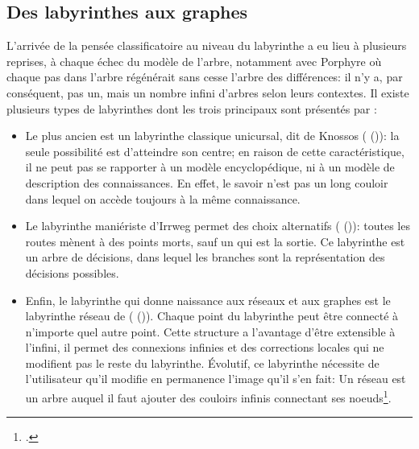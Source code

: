 \subsection{\label{III-A-1-b}Des labyrinthes aux graphes}

L'arrivée de la pensée classificatoire au niveau du labyrinthe a eu lieu à plusieurs reprises, à chaque échec du modèle de l'arbre, notamment avec Porphyre où chaque pas dans l'arbre régénérait sans cesse l'arbre des différences: il n'y a, par conséquent, pas un, mais un nombre infini d'arbres selon leurs contextes. Il existe plusieurs types de labyrinthes dont les trois principaux sont présentés par :
\begin{itemize}
	\item Le plus ancien est un labyrinthe classique unicursal, dit de Knossos ( ()): la seule possibilité est d'atteindre son centre; en raison de cette caractéristique, il ne peut pas se rapporter à un modèle encyclopédique, ni à un modèle de description des connaissances. En effet, le savoir n'est pas un long couloir dans lequel on accède toujours à la même connaissance.
	\item Le labyrinthe maniériste d'Irrweg permet des choix alternatifs ( ()): toutes les routes mènent à des points morts, sauf un qui est la sortie. Ce labyrinthe est un arbre de décisions, dans lequel les branches sont la représentation des décisions possibles.
	\item Enfin, le labyrinthe qui donne naissance aux réseaux et aux graphes est le \og labyrinthe réseau\fg{} de  ( ()). Chaque point du labyrinthe peut être connecté à n'importe quel autre point. Cette structure a l'avantage d'être extensible à l'infini, il permet des connexions infinies et des corrections locales qui ne modifient pas le reste du labyrinthe. Évolutif, ce labyrinthe nécessite de l'utilisateur qu'il modifie en permanence l'image qu'il s'en fait: \og Un réseau est un arbre auquel il faut ajouter des couloirs infinis connectant ses noeuds\fg{}\footcite{eco_arbre_2010}.
\end{itemize}
\medskip
